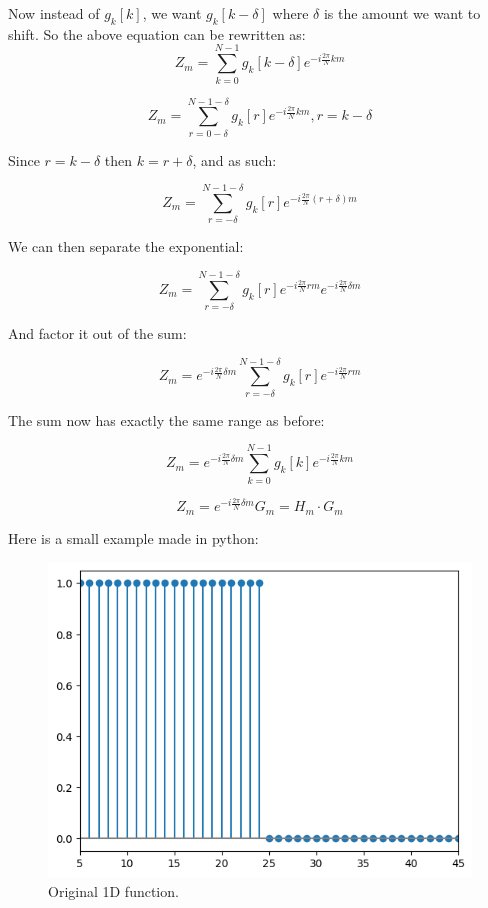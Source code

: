 \documentclass[]{usiinfbachelorproject}
\begin{document}
	Now instead of $g_k[k]$, we want $g_k[k - \delta]$ where $\delta$ is the amount we want to shift.
	So the above equation can be rewritten as:
	\begin{equation*}
		Z_m = \displaystyle\sum_{k=0}^{N-1}g_k[k - \delta]e^{-i \frac{2\pi}{N} km}
	\end{equation*}
	
	\begin{equation*}
		Z_m = \displaystyle\sum_{r = 0 - \delta}^{N-1-\delta}g_k[r]e^{-i \frac{2\pi}{N} km}, r = k - \delta 
	\end{equation*}
	
	Since $r = k - \delta$ then $ k = r + \delta$, and as such:
	
	\begin{equation*}
		Z_m = \displaystyle\sum_{r= -\delta}^{N-1 - \delta}g_k[r]e^{-i \frac{2\pi}{N} (r + \delta)m}
	\end{equation*}
	
	We can then separate the exponential:
	
	\begin{equation*}
		Z_m = \displaystyle\sum_{r= -\delta}^{N-1 - \delta}g_k[r]e^{-i \frac{2\pi}{N} rm}e^{-i \frac{2\pi}{N}  \delta m}
	\end{equation*}
	
	And factor it out of the sum:
	
	\begin{equation*}
		Z_m = e^{-i \frac{2\pi}{N}  \delta m} \displaystyle\sum_{r= -\delta}^{N-1 - \delta}g_k[r]e^{-i \frac{2\pi}{N} rm}
	\end{equation*}
	
	The sum now has exactly the same range as before:
	
	\begin{equation*}
		Z_m = e^{-i \frac{2\pi}{N}  \delta m} \displaystyle\sum_{k=0}^{N-1}g_k[k]e^{-i \frac{2\pi}{N} km}
	\end{equation*}
	
	\begin{equation}
		Z_m = e^{-i \frac{2\pi}{N}  \delta m} G_m = H_m \cdot G_m
	\end{equation}
	
	
	Here is a small example made in python:
	
	\begin{figure}[h]
		\centering
		\includegraphics[width=0.5\columnwidth]{images/box_original_n50.png}
		\caption{Original 1D function.}
	\end{figure}
	
\end{document}
